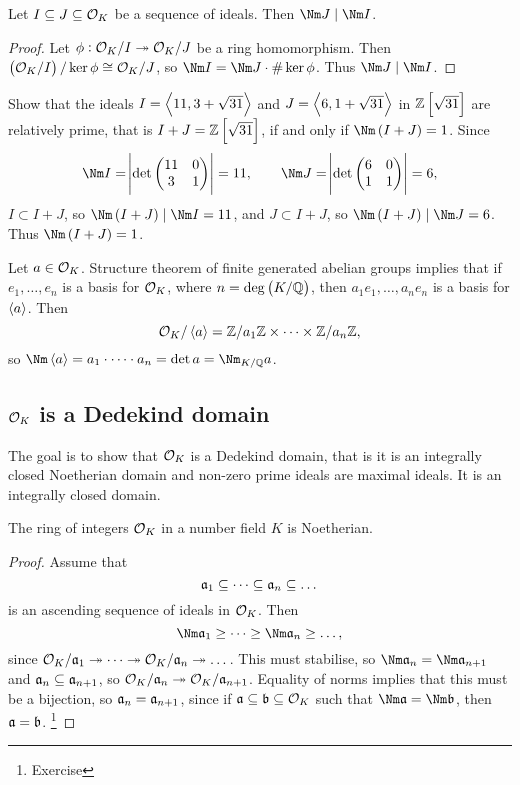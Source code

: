 \begin{proposition}
Let $ I \subseteq J \subseteq \mathcal{O}_K $ be a sequence of ideals. Then $ \Nm J \mid \Nm I $.
\end{proposition}

\begin{proof}
Let $ \phi : \mathcal{O}_K / I \twoheadrightarrow \mathcal{O}_K / J $ be a ring homomorphism. Then $ \br{\OOO_K / I} / \ker \phi \cong \OOO_K / J $, so $ \Nm I = \Nm J \cdot \#\ker \phi $. Thus $ \Nm J \mid \Nm I $.
\end{proof}

\begin{example*}
Show that the ideals $ I = \left\langle 11, 3 + \sqrt{31} \right\rangle $ and $ J = \left\langle 6, 1 + \sqrt{31} \right\rangle $ in $ \ZZ\sbr{\sqrt{31}} $ are relatively prime, that is $ I + J = \ZZ\sbr{\sqrt{31}} $, if and only if $ \Nm \br{I + J} = 1 $. Since
$$ \Nm I = \abs{\det \twobytwo{11}{0}{3}{1}} = 11, \qquad \Nm J = \abs{\det \twobytwo{6}{0}{1}{1}} = 6, $$
$ I \subset I + J $, so $ \Nm \br{I + J} \mid \Nm I = 11 $, and $ J \subset I + J $, so $ \Nm \br{I + J} \mid \Nm J = 6 $. Thus $ \Nm \br{I + J} = 1 $.
\end{example*}

Let $ a \in \mathcal{O}_K $. Structure theorem of finite generated abelian groups implies that if $ e_1, \dots, e_n $ is a basis for $ \mathcal{O}_K $, where $ n = \deg \br{K / \QQ} $, then $ a_1e_1, \dots, a_ne_n $ is a basis for $ \left\langle a \right\rangle $. Then
$$ \mathcal{O}_K / \left\langle a \right\rangle = \mathbb{Z} / a_1\mathbb{Z} \times \dots \times \mathbb{Z} / a_n\mathbb{Z}, $$
so $ \Nm \abr{a} = a_1 \cdot \dots \cdot a_n = \det a = \Nm_{K / \QQ} a $.

\subsection{\texorpdfstring{$ \mathcal{O}_K $}{OK} is a Dedekind domain}

The goal is to show that $ \mathcal{O}_K $ is a Dedekind domain, that is it is an integrally closed Noetherian domain and non-zero prime ideals are maximal ideals. It is an integrally closed domain.

\begin{proposition}
The ring of integers $ \mathcal{O}_K $ in a number field $ K $ is Noetherian.
\end{proposition}

\begin{proof}
Assume that
$$ \mathfrak{a}_1 \subseteq \dots \subseteq \mathfrak{a}_n \subseteq \dots $$
is an ascending sequence of ideals in $ \mathcal{O}_K $. Then
$$ \Nm \aaa_1 \ge \dots \ge \Nm \aaa_n \ge \dots, $$
since $ \mathcal{O}_K / \mathfrak{a}_1 \twoheadrightarrow \dots \twoheadrightarrow \mathcal{O}_K / \mathfrak{a}_n \twoheadrightarrow \dots $. This must stabilise, so $ \Nm \aaa_n = \Nm \aaa_{n + 1} $ and $ \mathfrak{a}_n \subseteq \mathfrak{a}_{n + 1} $, so $ \mathcal{O}_K / \mathfrak{a}_n \twoheadrightarrow \mathcal{O}_K / \mathfrak{a}_{n + 1} $. Equality of norms implies that this must be a bijection, so $ \mathfrak{a}_n = \mathfrak{a}_{n + 1} $, since if $ \mathfrak{a} \subseteq \mathfrak{b} \subseteq \mathcal{O}_K $ such that $ \Nm \aaa = \Nm \bbb $, then $ \mathfrak{a} = \mathfrak{b} $. \footnote{Exercise}
\end{proof}

